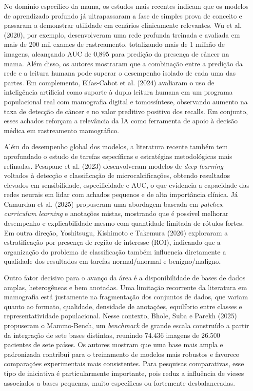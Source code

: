 No domínio específico da mama, os estudos mais recentes indicam que os modelos de aprendizado profundo já ultrapassaram a fase de simples prova de conceito e passaram a demonstrar utilidade em cenários clinicamente relevantes. Wu et al. (2020), por exemplo, desenvolveram uma rede profunda treinada e avaliada em mais de 200 mil exames de rastreamento, totalizando mais de 1 milhão de imagens, alcançando AUC de 0,895 para predição da presença de câncer na mama. Além disso, os autores mostraram que a combinação entre a predição da rede e a leitura humana pode superar o desempenho isolado de cada uma das partes. Em complemento, Elías-Cabot et al. (2024) avaliaram o uso de inteligência artificial como suporte à dupla leitura humana em um programa populacional real com mamografia digital e tomossíntese, observando aumento na taxa de detecção de câncer e no valor preditivo positivo dos recalls. Em conjunto, esses achados reforçam a relevância da IA como ferramenta de apoio à decisão médica em rastreamento mamográfico.

Além do desempenho global dos modelos, a literatura recente também tem aprofundado o estudo de tarefas específicas e estratégias metodológicas mais refinadas. Pesapane et al. (2023) desenvolveram modelos de \textit{deep learning} voltados à detecção e classificação de microcalcificações, obtendo resultados elevados em sensibilidade, especificidade e AUC, o que evidencia a capacidade das redes neurais em lidar com achados pequenos e de alta importância clínica. Já Camurdan et al. (2025) propuseram uma abordagem baseada em \textit{patches}, \textit{curriculum learning} e anotações mistas, mostrando que é possível melhorar desempenho e explicabilidade mesmo com quantidade limitada de rótulos fortes. Em outra direção, Yoshitsugu, Kishimoto e Takemura (2026) exploraram a estratificação por presença de região de interesse (ROI), indicando que a organização do problema de classificação também influencia diretamente a qualidade dos resultados em tarefas normal/anormal e benigno/maligno.

Outro fator decisivo para o avanço da área é a disponibilidade de bases de dados amplas, heterogêneas e bem anotadas. Uma limitação recorrente da literatura em mamografia está justamente na fragmentação dos conjuntos de dados, que variam quanto ao formato, qualidade, densidade de anotações, equilíbrio entre classes e representatividade populacional. Nesse contexto, Bhole, Suba e Parekh (2025) propuseram o Mammo-Bench, um \textit{benchmark} de grande escala construído a partir da integração de sete bases distintas, reunindo 74.436 imagens de 26.500 pacientes de sete países. Os autores mostram que uma base mais ampla e padronizada contribui para o treinamento de modelos mais robustos e favorece comparações experimentais mais consistentes. Para pesquisas comparativas, esse tipo de iniciativa é particularmente importante, pois reduz a influência de vieses associados a bases pequenas, muito específicas ou fortemente desbalanceadas.

